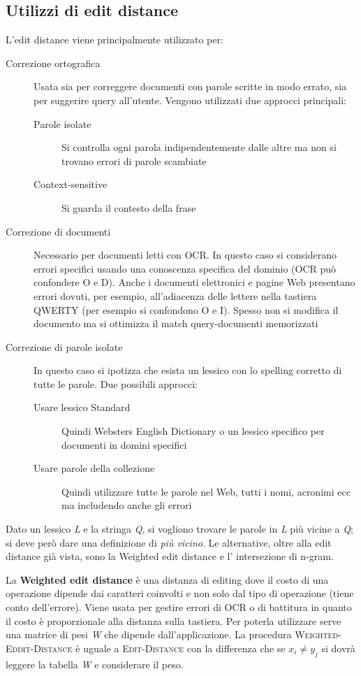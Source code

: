 \documentclass[10pt, a4paper]{report}
\begin{document}
\subsection{Utilizzi di edit distance}
L'edit distance viene principalmente utilizzato per:
\begin{description}
\item[Correzione ortografica] Usata sia per correggere documenti con parole scritte in modo errato, sia per suggerire query all'utente. Vengono utilizzati due approcci principali:
\begin{description}
\item[Parole isolate]Si controlla ogni parola indipendentemente dalle altre ma non si trovano errori di parole scambiate
\item[Context-sensitive]Si guarda il contesto della frase
\end{description}
\item[Correzione di documenti]Necessario per documenti letti con OCR. In questo caso si considerano errori specifici usando una conoscenza specifica del dominio (OCR può confondere O e D). Anche i documenti elettronici e pagine Web presentano errori dovuti, per esempio, all'adiacenza delle lettere nella tastiera QWERTY (per esempio si confondono O e I). Spesso non si modifica il documento ma si ottimizza il match query-documenti memorizzati 
\item[Correzione di parole isolate]In questo caso si ipotizza che esista un lessico con lo spelling corretto di tutte le parole. Due possibili approcci:
\begin{description}
\item[Usare lessico Standard]Quindi Websters English Dictionary o un lessico specifico per documenti in domini specifici
\item[Usare parole della collezione]Quindi utilizzare tutte le parole nel Web, tutti i nomi, acronimi ecc ma includendo anche gli errori
\end{description}
\end{description}
Dato un lessico \textit{L} e la stringa \textit{Q}, si vogliono trovare le parole in \textit{L} più vicine a \textit{Q}; si deve però dare una definizione di \textsl{più vicino}. Le alternative, oltre alla edit distance già vista, sono la Weighted edit distance e l' intersezione di n-gram.

La \textbf{Weighted edit distance} è una distanza di editing dove il costo di una operazione dipende dai caratteri coinvolti e non solo dal tipo di operazione (tiene conto dell'errore). Viene usata per gestire errori di OCR o di battitura in quanto il costo è proporzionale alla distanza sulla tastiera. Per poterla utilizzare serve una matrice di pesi \textit{W} che dipende dall'applicazione. La procedura \textsc{Weighted-Eddit-Distance} è uguale a \textsc{Edit-Distance} con la differenza che se $x_i \neq y_j$ si dovrà leggere la tabella \textit{W} e considerare il peso.
\end{document}
